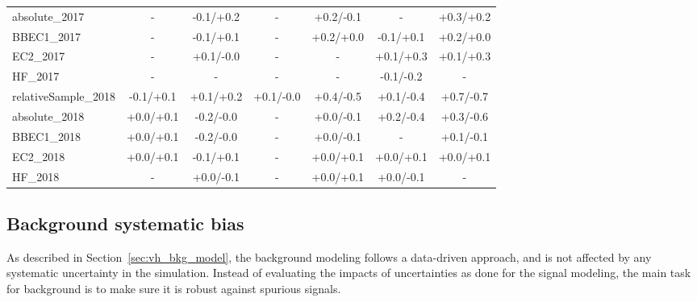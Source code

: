 \begin{table}[!htb]
{\begin{tabular}{l|c|c|c|c|c|c}
  absolute\_2017       & -           & -0.1/+0.2   & -           & +0.2/-0.1   & -           & +0.3/+0.2   \\   
  BBEC1\_2017          & -           & -0.1/+0.1   & -           & +0.2/+0.0   & -0.1/+0.1   & +0.2/+0.0   \\   
  EC2\_2017            & -           & +0.1/-0.0   & -           & -           & +0.1/+0.3   & +0.1/+0.3   \\   
  HF\_2017             & -           & -           & -           & -           & -0.1/-0.2   & -           \\   
  \hline
  relativeSample\_2018 & -0.1/+0.1   & +0.1/+0.2   & +0.1/-0.0   & +0.4/-0.5   & +0.1/-0.4   & +0.7/-0.7   \\
  absolute\_2018       & +0.0/+0.1   & -0.2/-0.0   & -           & +0.0/-0.1   & +0.2/-0.4   & +0.3/-0.6   \\   
  BBEC1\_2018          & +0.0/+0.1   & -0.2/-0.0   & -           & +0.0/-0.1   & -           & +0.1/-0.1   \\   
  EC2\_2018            & +0.0/+0.1   & -0.1/+0.1   & -           & +0.0/+0.1   & +0.0/+0.1   & +0.0/+0.1   \\   
  HF\_2018             & -           & +0.0/-0.1   & -           & +0.0/+0.1   & +0.0/-0.1   & -           \\   
  \hline

  \end{tabular}}
  \label{tab:vh_systematics_jec}
\end{table}


\clearpage
\subsection{Background systematic bias}\label{sec:bias_study}

As described in Section~\ref{sec:vh_bkg_model}, the background modeling follows a data-driven approach,
and is not affected by any systematic uncertainty in the simulation.
Instead of evaluating the impacts of uncertainties as done for the signal modeling, 
the main task for background is to make sure it is robust against spurious signals.

